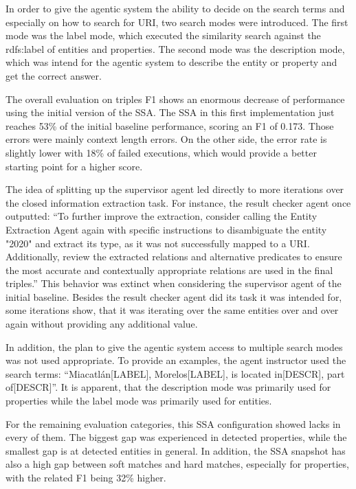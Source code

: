 \documentclass[a4paper,oneside,bibliography=totoc]{scrbook}
\begin{document}
In order to give the agentic system the ability to decide on the search terms and especially on how to search for URI, two search modes were introduced. The first mode was the label mode, which executed the similarity search against the rdfs:label of entities and properties. The second mode was the description mode, which was intend for the agentic system to describe the entity or property and get the correct answer.

The overall evaluation on triples F1 shows an enormous decrease of performance using the initial version of the \ac{SSA}. The \ac{SSA} in this first implementation just reaches 53\% of the initial baseline performance, scoring an F1 of 0.173. Those errors were mainly context length errors. On the other side, the error rate is slightly lower with 18\% of failed executions, which would provide a better starting point for a higher score.

The idea of splitting up the supervisor agent led directly to more iterations over the closed information extraction task. For instance, the result checker agent once outputted: \enquote{To further improve the extraction, consider calling the Entity Extraction Agent again with specific instructions to disambiguate the entity "2020" and extract its type, as it was not successfully mapped to a URI. Additionally, review the extracted relations and alternative predicates to ensure the most accurate and contextually appropriate relations are used in the final triples.} This behavior was extinct when considering the supervisor agent of the initial baseline. Besides the result checker agent did its task it was intended for, some iterations show, that it was iterating over the same entities over and over again without providing any additional value.

In addition, the plan to give the agentic system access to multiple search modes was not used appropriate. To provide an examples, the agent instructor used the search terms: \enquote{Miacatlán[LABEL], Morelos[LABEL], is located in[DESCR], part of[DESCR]}. It is apparent, that the description mode was primarily used for properties while the label mode was primarily used for entities.

For the remaining evaluation categories, this \ac{SSA} configuration showed lacks in every of them. The biggest gap was experienced in detected properties, while the smallest gap is at detected entities in general. In addition, the \ac{SSA} snapshot has also a high gap between soft matches and hard matches, especially for properties, with the related F1 being 32\% higher.
\end{document}
